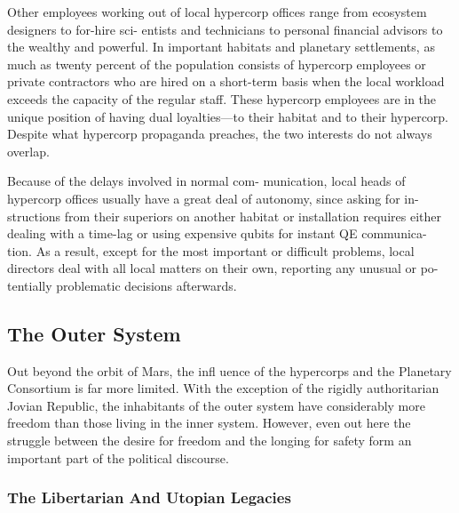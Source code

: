 Other employees working out of local hypercorp 
offices range from ecosystem designers to for-hire sci-
entists and technicians to personal financial advisors 
to the wealthy and powerful. In important habitats 
and planetary settlements, as much as twenty percent 
of the population consists of hypercorp employees 
or private contractors who are hired on a short-term 
basis when the local workload exceeds the capacity 
of the regular staff. These hypercorp employees are 
in the unique position of having dual loyalties—to 
their habitat and to their hypercorp. Despite what 
hypercorp propaganda preaches, the two interests do 
not always overlap.

Because of the delays involved in normal com-
munication, local heads of hypercorp offices usually 
have a great deal of autonomy, since asking for in-
structions from their superiors on another habitat or 
installation requires either dealing with a time-lag or 
using expensive qubits for instant QE communica-
tion. As a result, except for the most important or 
difficult problems, local directors deal with all local 
matters on their own, reporting any unusual or po-
tentially problematic decisions afterwards.

\subsection{The Outer System}

Out beyond the orbit of Mars, the infl uence of the 
hypercorps and the Planetary Consortium is far more 
limited. With the exception of the rigidly authoritarian 
Jovian Republic, the inhabitants of the outer system 
have considerably more freedom than those living in 
the inner system. However, even out here the struggle 
between the desire for freedom and the longing for 
safety form an important part of the political discourse.

\subsubsection{The Libertarian And Utopian Legacies}

